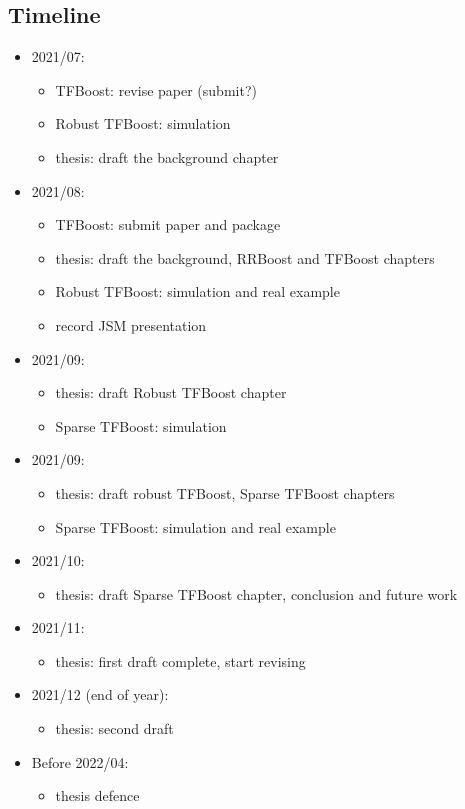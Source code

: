 \documentclass{article}
\begin{document}
\subsection{Timeline}
\begin{itemize}
    \item 2021/07: 
    \begin{itemize}
        \item  TFBoost: revise paper (submit?)
        \item Robust TFBoost: simulation 
        \item  thesis: draft the background chapter 
    \end{itemize}
   \item  2021/08:  \begin{itemize}
   \item  TFBoost: submit paper and package
        \item   thesis: draft the background,  RRBoost and TFBoost chapters 
        \item  Robust TFBoost: simulation and real example
        \item record JSM presentation
    \end{itemize}
    \item  2021/09:
    \begin{itemize}
    \item thesis: draft Robust TFBoost chapter
    \item Sparse TFBoost: simulation 
    \end{itemize}
   \item  2021/09:
    \begin{itemize}
    \item thesis: draft robust TFBoost, Sparse TFBoost chapters 
    \item Sparse TFBoost: simulation and real example
    \end{itemize}
    \item  2021/10:
    \begin{itemize}
    \item thesis: draft Sparse TFBoost chapter, conclusion and future work
    \end{itemize}
\item  2021/11:
    \begin{itemize}
    \item thesis: first draft complete, start revising 
    \end{itemize}
\item  2021/12 (end of year):     
\begin{itemize}
    \item thesis: second draft 
    \end{itemize}
\item Before  2022/04:
\begin{itemize}
    \item thesis defence 
    \end{itemize}
\end{itemize}



\end{document}
